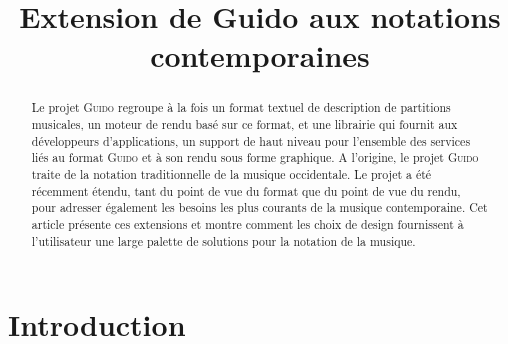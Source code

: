 \documentclass{article}
\title{\centering Extension de Guido aux notations contemporaines}
\newcommand{\guido}			{\textsc{Guido}}
\begin{document}

\maketitle

\begin{abstract}

Le projet \guido{} regroupe à la fois un format textuel de description de partitions musicales, un moteur de rendu basé sur ce format, et une librairie qui fournit aux développeurs d'applications, un support de haut niveau pour l'ensemble des services liés au format \guido{} et à son rendu sous forme graphique. 
A l'origine, le projet \guido{} traite de la notation traditionnelle de la musique occidentale. Le projet a été récemment étendu, tant du point de vue du format que du point de vue du rendu, pour adresser également les besoins les plus courants de la musique contemporaine. Cet article présente ces extensions et montre comment les choix de design fournissent à l'utilisateur une large palette de solutions pour la notation de la musique. 


\end{abstract}


\section{Introduction}\label{sec:introduction}

% 
\end{document}
